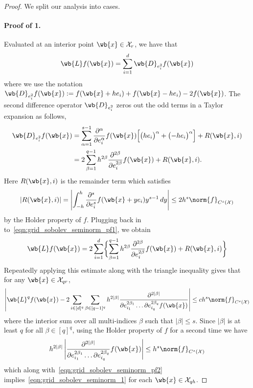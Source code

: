\documentclass{article}
\newcommand{\abs}[1]{\left \lvert #1 \right \rvert}
\newcommand{\1}{\mathbf{1}}
\newcommand{\Xset}{\mathcal{X}}
\theoremstyle{alden}
\theoremstyle{aldenthm}
\theoremstyle{definition}
\theoremstyle{remark}
\begin{document}
\begin{proof}
	We split our analysis into cases.
	
	\paragraph{Proof of 1.}
	Evaluated at an interior point $\wb{x} \in \Xset_r$, we have that
	\begin{equation}
	\label{eqn:grid_sobolev_seminorm_pf1}
	\wb{L}f(\wb{x}) = \sum_{i = 1}^d \wb{D}_{e_i^2}f(\wb{x})
	\end{equation}
	where we use the notation $\wb{D}_{e_i^2}f(\wb{x}) := f(\wb{x} + he_i) + f(\wb{x} - he_i) - 2f(\wb{x})$. The second difference operator $\wb{D}_{e_i^2}$ zeros out the odd terms in a Taylor expansion as follows,
	\begin{align*}
	\wb{D}_{e_i^2}f(\wb{x}) & = \sum_{\alpha = 1}^{s - 1} \frac{\partial^{\alpha}}{\partial e_i^{\alpha}}f(\wb{x}) \Bigl[\bigl(he_i\bigr)^{\alpha} + \bigl(-he_i\bigr)^{\alpha}\Bigr] + R(\wb{x},i) \\
	& = 2\sum_{\beta = 1}^{q - 1} h^{2\beta}\frac{\partial^{2\beta}}{\partial e_i^{2\beta}}f(\wb{x}) + R(\wb{x},i).
	\end{align*}
	Here $R(\wb{x},i)$ is the remainder term which satisfies
	\begin{equation*}
	\abs{R(\wb{x},i)} = \abs{\int_{-h}^{h}  \frac{\partial^{s}}{\partial e_i^{s}} f(\wb{x} + ye_i) y^{s - 1}\,dy} \leq 2 h^s \norm{f}_{C^s(\Xset)}
	\end{equation*}
	by the Holder property of $f$. Plugging back in to~\eqref{eqn:grid_sobolev_seminorm_pf1}, we obtain
	\begin{equation*}
	\wb{L}f(\wb{x}) = 2\sum_{i = 1}^{d} \biggl\{\sum_{\beta = 1}^{q - 1} h^{2\beta}\frac{\partial^{2\beta}}{\partial e_i^{2\beta}}f(\wb{x}) + R(\wb{x},i)\biggr\}
	\end{equation*}
	Repeatedly applying this estimate along with the triangle inequality gives that for any $\wb{x} \in \Xset_{qr}$,
	\begin{equation}
	\label{eqn:grid_sobolev_seminorm_pf2}
	\abs{\wb{L}^qf(\wb{x}) - 2 \sum_{i \in [d]^q} \sum_{\beta \in [q - 1]^q} h^{2\abs{\beta}} \frac{\partial^{2\abs{\beta}}}{\partial e_{i_1}^{2\beta_1}\ldots \partial e_{i_q}^{2\beta_q} f(\wb{x})} } \leq c h^s\norm{f}_{C^s(\Xset)}
	\end{equation}
	where the interior sum over all multi-indices $\beta$ such that $\abs{\beta} \leq s$. Since $\abs{\beta}$ is at least $q$ for all $\beta \in [q]^q$, using the Holder property of $f$ for a second time we have
	\begin{equation*}
	h^{2\abs{\beta}} \abs{\frac{\partial^{2\abs{\beta}}}{\partial e_{i_1}^{2\beta_1}\ldots \partial e_{i_q}^{2\beta_q}} f(\wb{x})} \leq h^s \norm{f}_{C^s(\Xset)}
	\end{equation*}
	which along with~\eqref{eqn:grid_sobolev_seminorm_pf2} implies~\eqref{eqn:grid_sobolev_seminorm_1} for each $\wb{x} \in \Xset_{qh}$.
	

\end{proof}
\end{document}
